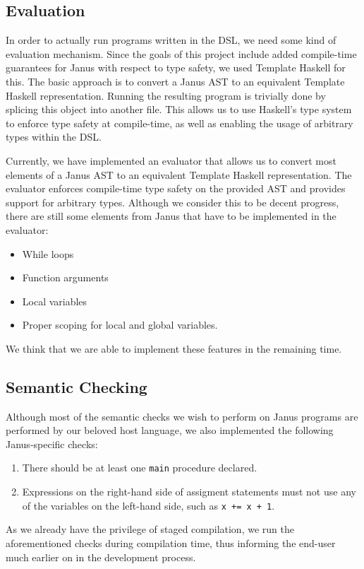 \documentclass[12pt,a4paper]{article}
\newcommand{\code}[1]{\texttt{#1}}
\begin{document}
\subsection{Evaluation}
In order to actually run programs written in the DSL, we need some kind of evaluation mechanism. Since the goals of this project include added compile-time guarantees for Janus with respect to type safety, we used Template Haskell for this. The basic approach is to convert a Janus AST to an equivalent Template Haskell representation. Running the resulting program is trivially done by splicing this object into another file. This allows us to use Haskell's type system to enforce type safety at compile-time, as well as enabling the usage of arbitrary types within the DSL.

Currently, we have implemented an evaluator that allows us to convert most elements of a Janus AST to an equivalent Template Haskell representation. The evaluator enforces compile-time type safety on the provided AST and provides support for arbitrary types. Although we consider this to be decent progress, there are still some elements from Janus that have to be implemented in the evaluator:
\begin{itemize}
\item 
While loops
\item
Function arguments
\item
Local variables
\item
Proper scoping for local and global variables. 
\end{itemize}
We think that we are able to implement these features in the remaining time. 

\subsection{Semantic Checking}
Although most of the semantic checks we wish to perform on Janus programs are performed by our beloved host language, we also implemented the following Janus-specific checks:
\begin{enumerate}
\item There should be at least one \code{main} procedure declared.
\item Expressions on the right-hand side of assigment statements must not use any of the variables on the left-hand side, such as \code{x += x + 1}.
\end{enumerate}
As we already have the privilege of staged compilation, we run the aforementioned checks during compilation time, thus informing the end-user much earlier on in the development process.
\end{document}
